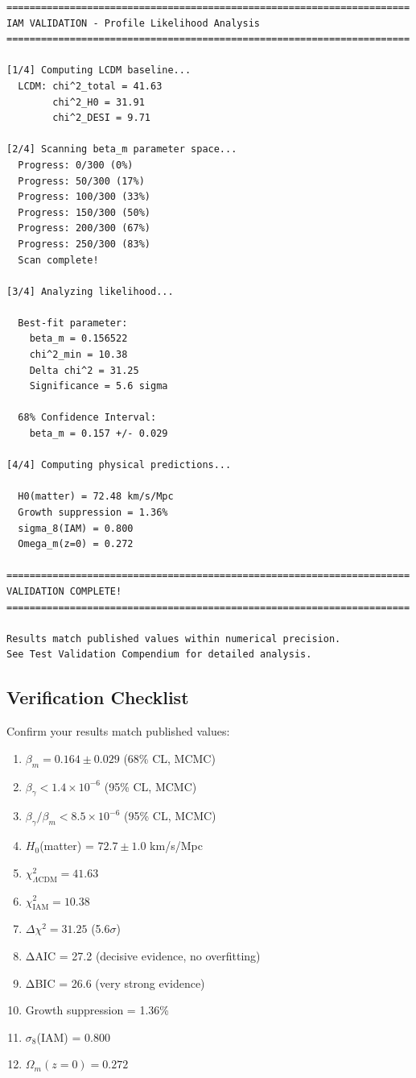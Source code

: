 \documentclass[11pt]{article}
\begin{document}
\begin{lstlisting}
======================================================================
IAM VALIDATION - Profile Likelihood Analysis
======================================================================

[1/4] Computing LCDM baseline...
  LCDM: chi^2_total = 41.63
        chi^2_H0 = 31.91
        chi^2_DESI = 9.71

[2/4] Scanning beta_m parameter space...
  Progress: 0/300 (0%)
  Progress: 50/300 (17%)
  Progress: 100/300 (33%)
  Progress: 150/300 (50%)
  Progress: 200/300 (67%)
  Progress: 250/300 (83%)
  Scan complete!

[3/4] Analyzing likelihood...

  Best-fit parameter:
    beta_m = 0.156522
    chi^2_min = 10.38
    Delta chi^2 = 31.25
    Significance = 5.6 sigma

  68% Confidence Interval:
    beta_m = 0.157 +/- 0.029

[4/4] Computing physical predictions...

  H0(matter) = 72.48 km/s/Mpc
  Growth suppression = 1.36%
  sigma_8(IAM) = 0.800
  Omega_m(z=0) = 0.272

======================================================================
VALIDATION COMPLETE!
======================================================================

Results match published values within numerical precision.
See Test Validation Compendium for detailed analysis.
\end{lstlisting}

\subsection{Verification Checklist}

Confirm your results match published values:

\begin{enumerate}
    \item[$\square$] $\beta_m = 0.164 \pm 0.029$ (68\% CL, MCMC)
    \item[$\square$] $\beta_\gamma < 1.4 \times 10^{-6}$ (95\% CL, MCMC)
    \item[$\square$] $\beta_\gamma/\beta_m < 8.5 \times 10^{-6}$ (95\% CL, MCMC)
    \item[$\square$] $H_0$(matter) = $72.7 \pm 1.0$ km/s/Mpc
    \item[$\square$] $\chi^2_{\Lambda\text{CDM}} = 41.63$
    \item[$\square$] $\chi^2_{\text{IAM}} = 10.38$
    \item[$\square$] $\Delta\chi^2 = 31.25$ (5.6$\sigma$)
    \item[$\square$] ΔAIC = 27.2 (decisive evidence, no overfitting)
    \item[$\square$] ΔBIC = 26.6 (very strong evidence)
    \item[$\square$] Growth suppression = 1.36\%
    \item[$\square$] $\sigma_8$(IAM) = 0.800
    \item[$\square$] $\Omega_m(z=0) = 0.272$
\end{enumerate}
\end{document}
